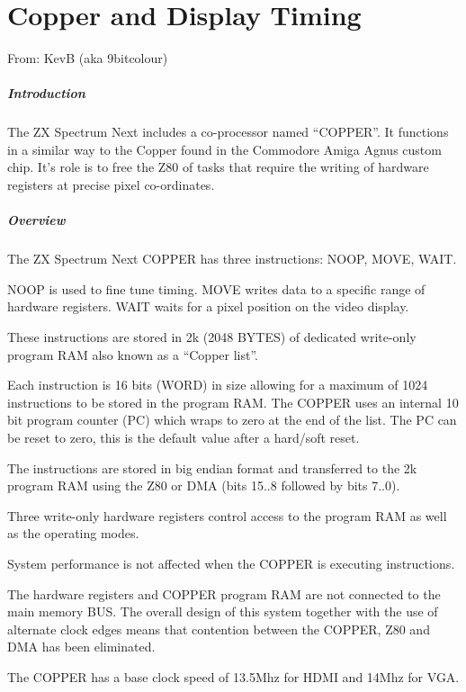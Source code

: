 \chapter{Copper and Display Timing}
From: KevB (aka 9bitcolour)

\paragraph{Introduction}

The ZX Spectrum Next includes a co-processor named ``COPPER''. It
functions in a similar way to the Copper found in the Commodore Amiga
Agnus custom chip.  It's role is to free the Z80 of tasks that require
the writing of hardware registers at precise pixel co-ordinates.

\paragraph{Overview}

The ZX Spectrum Next COPPER has three instructions: NOOP, MOVE, WAIT. 

NOOP is used to fine tune timing. MOVE writes data to a specific range
of hardware registers. WAIT waits for a pixel position on the video
display.

These instructions are stored in 2k (2048 BYTES) of dedicated
write-only program RAM also known as a ``Copper list''.

Each instruction is 16 bits (WORD) in size allowing for a maximum of
1024 instructions to be stored in the program RAM. The COPPER uses an
internal 10 bit program counter (PC) which wraps to zero at the end of
the list. The PC can be reset to zero, this is the default value after
a hard/soft reset.

The instructions are stored in big endian format and transferred to
the 2k program RAM using the Z80 or DMA (bits 15..8 followed by bits
7..0).

Three write-only hardware registers control access to the program RAM
as well as the operating modes.

System performance is not affected when the COPPER is executing instructions.

The hardware registers and COPPER program RAM are not connected to the
main memory BUS. The overall design of this system together with the
use of alternate clock edges means that contention between the COPPER,
Z80 and DMA has been eliminated.

The COPPER has a base clock speed of 13.5Mhz for HDMI and 14Mhz for VGA.

